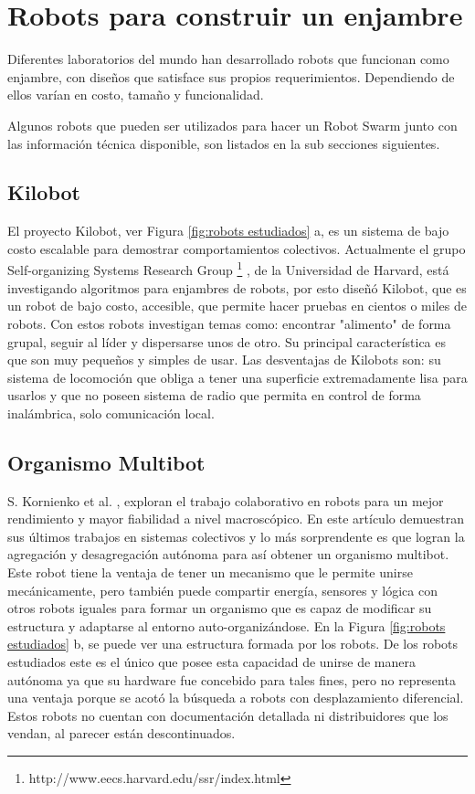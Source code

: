 \section{Robots para construir un enjambre}

Diferentes laboratorios del mundo han desarrollado robots que funcionan como enjambre, con diseños que satisface sus propios requerimientos. Dependiendo de ellos varían en costo, tamaño y funcionalidad.

Algunos robots que pueden ser utilizados para hacer un Robot Swarm junto con las información técnica disponible, son listados en la sub secciones siguientes.

\subsection{Kilobot}
El proyecto Kilobot, ver Figura \ref{fig:robots estudiados} a, es un sistema de bajo costo escalable para demostrar comportamientos colectivos. Actualmente el grupo Self-organizing Systems Research Group \footnote{http://www.eecs.harvard.edu/ssr/index.html} , de la Universidad de Harvard, está investigando algoritmos para enjambres de robots, por esto diseñó Kilobot, que es un robot de bajo costo, accesible,  que permite hacer pruebas en cientos o miles de robots. Con estos robots investigan temas como: encontrar "alimento" de forma grupal, seguir al líder y dispersarse unos de otro. Su principal característica es que son muy pequeños y simples de usar. Las desventajas de Kilobots son: su sistema de locomoción que obliga a tener una superficie extremadamente lisa para usarlos y que no poseen sistema de radio que permita en control de forma inalámbrica, solo comunicación local.

\subsection{Organismo Multibot}
S. Kornienko et al. \cite{5359578}, exploran el trabajo colaborativo en robots para un mejor rendimiento y mayor fiabilidad a nivel macroscópico. En este artículo demuestran sus últimos trabajos en sistemas colectivos y lo más sorprendente es que logran la agregación y desagregación autónoma para así obtener un organismo multibot. Este robot tiene la ventaja de tener un mecanismo que le permite unirse mecánicamente, pero también puede compartir energía, sensores y lógica con otros robots iguales para formar un organismo que es capaz de modificar su estructura y adaptarse al entorno auto-organizándose. En la Figura \ref{fig:robots estudiados} b, se puede ver una estructura formada por los robots. De los robots estudiados este es el único que posee esta capacidad de unirse de manera autónoma ya que su hardware fue concebido para tales fines, pero no representa una ventaja porque se acotó la búsqueda a robots con desplazamiento diferencial. Estos robots no cuentan con documentación detallada ni distribuidores que los vendan, al parecer están descontinuados.

